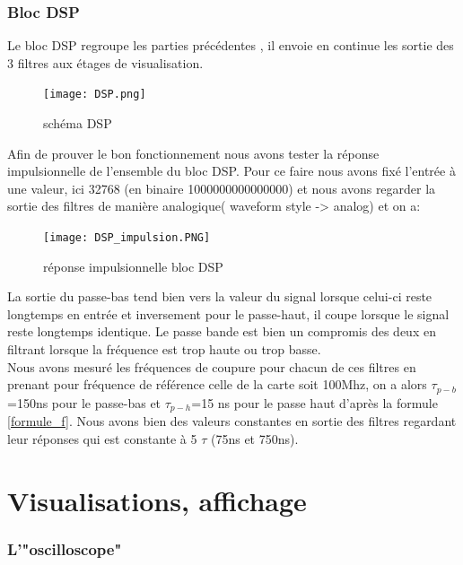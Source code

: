 \documentclass[hidelinks]{article}
\begin{document}
    \section{Bloc DSP}
    Le bloc DSP regroupe les parties précédentes , il envoie en continue les sortie des 3 filtres aux étages de visualisation.
    
	\begin{figure}[h]
		\centering
		\texttt{[image: DSP.png]}
		\caption{schéma DSP}
	\end{figure}
	Afin de prouver le bon fonctionnement nous avons tester la réponse impulsionnelle de l'ensemble du bloc DSP. Pour ce faire nous avons fixé l'entrée à une valeur, ici 32768 (en binaire 1000000000000000) et nous avons regarder la sortie des filtres de manière analogique( waveform style -> analog) et on a:
	
	\begin{figure}[H]
		\centering
		\texttt{[image: DSP\_impulsion.PNG]}
		\caption{réponse impulsionnelle bloc DSP}
	\end{figure}

	La sortie du passe-bas tend bien vers la valeur du signal lorsque celui-ci reste longtemps en entrée et inversement pour le passe-haut, il coupe lorsque le signal reste longtemps identique. Le passe bande est bien un compromis des deux en filtrant lorsque la fréquence est trop haute ou trop basse.\\
	Nous avons mesuré les fréquences de coupure pour chacun de ces filtres en prenant pour fréquence de référence celle de la carte soit 100Mhz, on a alors $\tau_{p-b}$=150ns pour le passe-bas et $\tau_{p-h}$=15 ns pour le passe haut d'après la formule \ref{formule_f}. Nous avons bien des valeurs constantes en sortie des filtres regardant leur réponses qui est constante à 5 $\tau$ (75ns et 750ns).
	\newpage

    \part{Visualisations, affichage}
    \section{L'"oscilloscope"}
\end{document}
